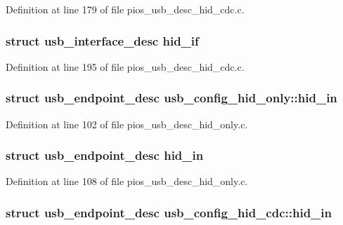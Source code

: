 Definition at line 179 of file pios\-\_\-usb\-\_\-desc\-\_\-hid\-\_\-cdc.\-c.

\hypertarget{group___p_i_o_s___u_s_b___d_e_s_c_ga66dd41530dc7e219cf377870362857ce}{
\subsubsection[{hid\-\_\-if}]{\setlength{\rightskip}{0pt plus 5cm}struct {\bf usb\-\_\-interface\-\_\-desc} hid\-\_\-if}}\label{group___p_i_o_s___u_s_b___d_e_s_c_ga66dd41530dc7e219cf377870362857ce}


Definition at line 195 of file pios\-\_\-usb\-\_\-desc\-\_\-hid\-\_\-cdc.\-c.

\hypertarget{group___p_i_o_s___u_s_b___d_e_s_c_gac0401b402235f315c995eb13de1425ec}{
\subsubsection[{hid\-\_\-in}]{\setlength{\rightskip}{0pt plus 5cm}struct {\bf usb\-\_\-endpoint\-\_\-desc} usb\-\_\-config\-\_\-hid\-\_\-only\-::hid\-\_\-in}}\label{group___p_i_o_s___u_s_b___d_e_s_c_gac0401b402235f315c995eb13de1425ec}


Definition at line 102 of file pios\-\_\-usb\-\_\-desc\-\_\-hid\-\_\-only.\-c.

\hypertarget{group___p_i_o_s___u_s_b___d_e_s_c_gad74809997499537622da0aaac4d1c3da}{
\subsubsection[{hid\-\_\-in}]{\setlength{\rightskip}{0pt plus 5cm}struct {\bf usb\-\_\-endpoint\-\_\-desc} hid\-\_\-in}}\label{group___p_i_o_s___u_s_b___d_e_s_c_gad74809997499537622da0aaac4d1c3da}


Definition at line 108 of file pios\-\_\-usb\-\_\-desc\-\_\-hid\-\_\-only.\-c.

\hypertarget{group___p_i_o_s___u_s_b___d_e_s_c_gaf6d4567d3dfbf3397c5842bdef4e13c8}{
\subsubsection[{hid\-\_\-in}]{\setlength{\rightskip}{0pt plus 5cm}struct {\bf usb\-\_\-endpoint\-\_\-desc} usb\-\_\-config\-\_\-hid\-\_\-cdc\-::hid\-\_\-in}}\label{group___p_i_o_s___u_s_b___d_e_s_c_gaf6d4567d3dfbf3397c5842bdef4e13c8}


